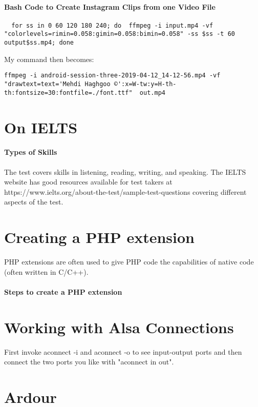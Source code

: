 \documentclass{article}
\begin{document}
\paragraph{Bash Code to Create Instagram Clips from one Video File}
\begin{verbatim}
  for ss in 0 60 120 180 240; do  ffmpeg -i input.mp4 -vf "colorlevels=rimin=0.058:gimin=0.058:bimin=0.058" -ss $ss -t 60 output$ss.mp4; done

\end{verbatim}

My command then becomes:
\begin{verbatim}
ffmpeg -i android-session-three-2019-04-12_14-12-56.mp4 -vf "drawtext=text='Mehdi Haghgoo ©':x=W-tw:y=H-th-th:fontsize=30:fontfile=./font.ttf"  out.mp4
\end{verbatim}

\section{On IELTS}
\paragraph*{Types of Skills}
The test covers skills in listening, reading, writing, and speaking.
The IELTS website has good resources available for test takers at https://www.ielts.org/about-the-test/sample-test-questions covering different aspects of the test.



\section{Creating a PHP extension}
PHP extensions are often used to give PHP code the capabilities of native code (often written in C/C++).
\paragraph*{Steps to create a PHP extension}


\section{Working with Alsa Connections}
First invoke aconnect -i and aconnect -o to see input-output ports and then connect the two ports you like with "aconnect in out".




\section{Ardour}
\end{document}

